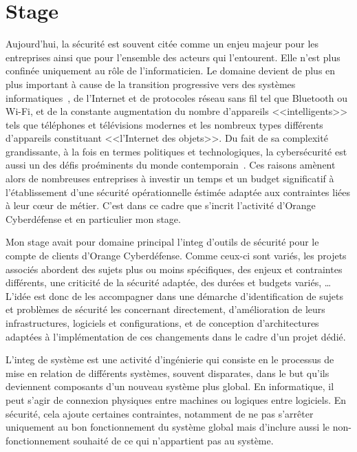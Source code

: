 \documentclass[12pt, oneside, a4paper, titlepage]{report}
\begin{document}
\section{Stage}%
\label{sec:intro::stage}

Aujourd'hui, la sécurité est souvent citée comme un enjeu majeur pour les
entreprises ainsi que pour l'ensemble des acteurs qui l'entourent. Elle n'est
plus confinée uniquement au rôle de l'informaticien. Le domaine devient de plus
en plus important à cause de la transition progressive vers des systèmes
informatiques~\cite{reliance}, de l'Internet et de protocoles réseau sans fil
tel que Bluetooth ou Wi-Fi, et de la constante augmentation du nombre
d'appareils <<intelligents>> tels que téléphones et télévisions modernes et les
nombreux types différents d'appareils constituant <<l'Internet des objets>>. Du
fait de sa complexité grandissante, à la fois en termes politiques et
technologiques, la cybersécurité est aussi un des défis proéminents du monde
contemporain~\cite{global-cyber}. Ces raisons amènent alors de nombreuses
entreprises à investir un temps et un budget significatif à l'établissement
d'une sécurité opérationnelle éstimée adaptée aux contraintes liées à leur cœur
de métier. C'est dans ce cadre que s'incrit l'activité d'Orange Cyberdéfense et
en particulier mon stage.

Mon stage avait pour domaine principal l'\gls{integ} d'outils de sécurité pour
le compte de clients d'Orange Cyberdéfense. Comme ceux-ci sont variés, les
projets associés abordent des sujets plus ou moins spécifiques, des enjeux et
contraintes différents, une criticité de la sécurité adaptée, des durées et
budgets variés, \ldots{} L'idée est donc de les accompagner dans une démarche
d'identification de sujets et problèmes de sécurité les concernant directement,
d'amélioration de leurs infrastructures, logiciels et configurations, et de
conception d'architectures adaptées à l'implémentation de ces changements dans
le cadre d'un projet dédié.

L'\gls{integ} de système est une activité d'ingénierie qui consiste en le
processus de mise en relation de différents systèmes, souvent disparates, dans
le but qu'ils deviennent composants d'un nouveau système plus global. En
informatique, il peut s'agir de connexion physiques entre machines ou logiques
entre logiciels. En sécurité, cela ajoute certaines contraintes, notamment de ne
pas s'arrêter uniquement au bon fonctionnement du système global mais d'inclure
aussi le non-fonctionnement souhaité de ce qui n'appartient pas au système.
\end{document}
